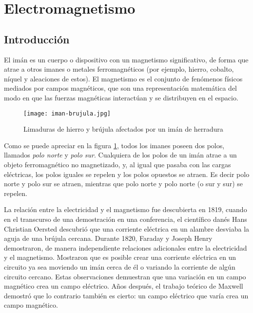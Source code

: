 \section{Electromagnetismo}

\subsection{Introducción}

El imán es un cuerpo o dispositivo con un magnetismo significativo, de forma que atrae a otros imanes o metales ferromagnéticos (por ejemplo, hierro, cobalto, níquel y aleaciones de estos). El magnetismo es el conjunto de fenómenos físicos mediados por campos magnéticos, que son una representación matemática del modo en que las fuerzas magnéticas interactúan y se distribuyen en el espacio.

\begin{figure}[ht]
  \centering
  \texttt{[image: iman-brujula.jpg]}
  \caption{Limaduras de hierro y brújula afectados por un imán de herradura}
  \label{fig:iman}
\end{figure}

Como se puede apreciar en la figura \ref{fig:iman}, todos los imanes poseen dos polos, llamados \textit{polo norte} y \textit{polo sur}. Cualquiera de los polos de un imán atrae a un objeto ferromagnético no magnetizado, y, al igual que pasaba con las cargas eléctricas, los polos iguales se repelen y los polos opuestos se atraen. Es decir polo norte y polo sur se atraen, mientras que polo norte y polo norte (o sur y sur) se repelen.

La relación entre la electricidad y el magnetismo fue descubierta en 1819, cuando en el transcurso de una demostración en una conferencia, el científico danés Hans Christian Oersted descubrió que una corriente eléctrica en un alambre desviaba la aguja de una brújula cercana. Durante 1820, Faraday y Joseph Henry demostraron, de manera independiente relaciones adicionales entre la electricidad y el magnetismo. Mostraron que es posible crear una corriente eléctrica en un circuito ya sea moviendo un imán cerca de él o variando la corriente de algún circuito cercano. Estas observaciones demuestran que una variación en un campo magnético crea un campo eléctrico. Años después, el trabajo teórico de Maxwell demostró que lo contrario también es cierto: un campo eléctrico que varía crea un campo magnético.


\clearpage









